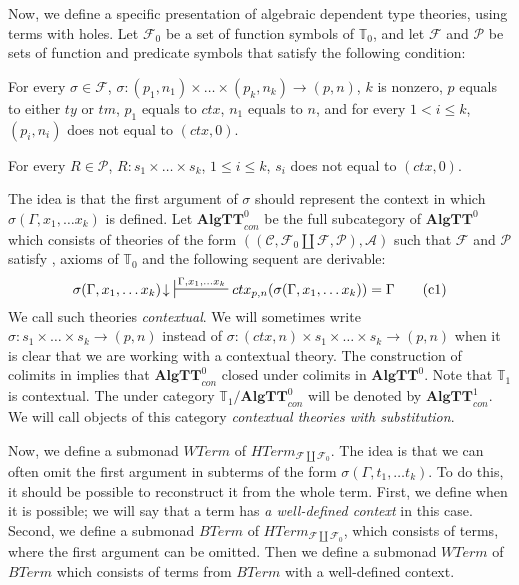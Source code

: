 \documentclass{elsarticle}
\newcommand{\axtag}[1]{\label{ax:#1} \tag{#1}}
\theoremstyle{definition}
\theoremstyle{remark}
\newcommand{\cat}[1]{\mathbf{#1}}
\newcommand{\algtt}{\cat{AlgTT}}
\numberwithin{figure}{section}
\begin{document}
Now, we define a specific presentation of algebraic dependent type theories, using terms with holes.
Let $\mathcal{F}_0$ be a set of function symbols of $\mathbb{T}_0$, and let $\mathcal{F}$ and $\mathcal{P}$ be sets of function and predicate symbols that satisfy the following condition:
\begin{cond}[ctx]
For every $\sigma \in \mathcal{F}$, $\sigma : (p_1,n_1) \times \ldots \times (p_k,n_k) \to (p,n)$,
    $k$ is nonzero, $p$ equals to either $ty$ or $tm$, $p_1$ equals to $ctx$, $n_1$ equals to $n$, and for every $1 < i \leq k$, $(p_i,n_i)$ does not equal to $(ctx,0)$.

For every $R \in \mathcal{P}$, $R : s_1 \times \ldots \times s_k$, $1 \leq i \leq k$, $s_i$ does not equal to $(ctx,0)$.
\end{cond}
The idea is that the first argument of $\sigma$ should represent the context in which $\sigma(\Gamma, x_1, \ldots x_k)$ is defined.
Let $\algtt^0_{con}$ be the full subcategory of $\algtt^0$ which consists of theories of the form $((\mathcal{C}, \mathcal{F}_0 \amalg \mathcal{F}, \mathcal{P}), \mathcal{A})$
    such that $\mathcal{F}$ and $\mathcal{P}$ satisfy , axioms of $\mathbb{T}_0$ and the following sequent are derivable:
\begin{equation}
\sigma(\Gamma, x_1, \ldots x_k)\!\downarrow\ \sststile{}{\Gamma, x_1, \ldots x_k} ctx_{p,n}(\sigma(\Gamma, x_1, \ldots x_k)) = \Gamma \axtag{c1}
\end{equation}
We call such theories \emph{contextual}.
We will sometimes write $\sigma : s_1 \times \ldots \times s_k \to (p,n)$ instead of $\sigma : (ctx,n) \times s_1 \times \ldots \times s_k \to (p,n)$
    when it is clear that we are working with a contextual theory.
The construction of colimits in  implies that $\algtt^0_{con}$ closed under colimits in $\algtt^0$.
Note that $\mathbb{T}_1$ is contextual.
The under category $\mathbb{T}_1/\algtt^0_{con}$ will be denoted by $\algtt^1_{con}$.
We will call objects of this category \emph{contextual theories with substitution}.

Now, we define a submonad $WTerm$ of $HTerm_{\mathcal{F} \amalg \mathcal{F}_0}$.
The idea is that we can often omit the first argument in subterms of the form $\sigma(\Gamma, t_1, \ldots t_k)$.
To do this, it should be possible to reconstruct it from the whole term.
First, we define when it is possible; we will say that a term has \emph{a well-defined context} in this case.
Second, we define a submonad $BTerm$ of $HTerm_{\mathcal{F} \amalg \mathcal{F}_0}$, which consists of terms, where the first argument can be omitted.
Then we define a submonad $WTerm$ of $BTerm$ which consists of terms from $BTerm$ with a well-defined context.
\end{document}
